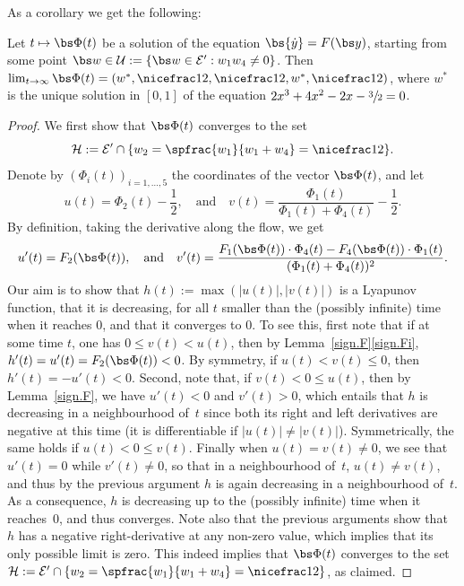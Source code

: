 As a corollary we get the following:
\begin{lemma}\label{lem:conv.lozenge}
Let $t\mapsto \bs \Phi(t)$ be a solution of the equation ${\bs{\dot y}} =F({\bs y})$, starting from some point $\bs w\in \mathcal U:=\{\bs w \in \mathcal E' : w_1w_4\neq 0\}$.
Then $\lim_{t\to \infty} \bs \Phi(t) = (w^*, \nicefrac12, \nicefrac12, w^*, \nicefrac12)$, where $w^*$ is the unique solution in $[0,1]$ of the equation $2x^3+4x^2-2x-\sfrac32=0$.
\end{lemma}
\begin{proof}
We first show that $\bs \Phi(t)$ converges to the set
\[
\mathcal H:= \mathcal E'\cap \{w_2={\spfrac{w_1}{w_1+w_4}}=\nicefrac12\}.
\]
Denote by $(\Phi_i(t))_{i=1,\dots,5}$ the coordinates of the vector $\bs \Phi(t)$, and let
\[
u(t) = \Phi_2(t) - \frac12, \quad \text{and}\quad v(t) = \frac{\Phi_1(t)}{\Phi_1(t)+ \Phi_4(t)} - \frac12.
\]
By definition, taking the derivative along the flow, we get
\[
u'(t) = F_2 (\bs \Phi(t)), \quad \text{and}\quad v'(t) = \frac{F_1(\bs \Phi(t))\cdot \Phi_4(t) - F_4(\bs \Phi(t))\cdot\Phi_1(t)}{(\Phi_1(t) + \Phi_4(t))^2 }.
\]
Our aim is to show that $h(t):=\max(|u(t)|,|v(t)|)$ is a Lyapunov function, \ie that it is decreasing, for all $t$ smaller than the (possibly infinite) time when it reaches $0$, and that it converges to $0$. To see this, first note that if at some time $t$, one has $0\le v(t)<u(t)$,
then by Lemma~\ref{sign.F}\eqref{sign.Fi}, $h'(t) = u'(t) = F_2(\bs \Phi(t)) <0$. By symmetry, if $u(t)<v(t) \le 0$, then $h'(t) = -u'(t) <0$.
Second, note that, if $v(t) < 0 \le u(t)$, then by Lemma~\ref{sign.F}, we have $u'(t) <0$ and $v'(t)>0$, which entails that $h$ is decreasing in a neighbourhood of~$t$ since both its right and left derivatives are negative at this time (it is differentiable if $|u(t)|\neq |v(t)|$).
Symmetrically, the same holds if $u(t)<0\le v(t)$.
Finally when $u(t) = v(t)\neq 0$, we see that $u'(t) = 0$ while
$v'(t)\neq 0$, so that in a neighbourhood of~$t$,
$u(t)\neq v(t)$, and thus by the previous argument $h$ is again decreasing in a neighbourhood of~$t$.
As a consequence, $h$ is decreasing up to the (possibly infinite) time when it reaches~$0$, and thus converges. Note also that the previous arguments show that~$h$ has a negative right-derivative at any non-zero value, which implies that its only possible limit is zero.
This indeed implies that $\bs \Phi(t)$ converges to the set $\mathcal H:= \mathcal E'\cap \{w_2={\spfrac{w_1}{w_1+w_4}}=\nicefrac12\}$, as claimed.


\end{proof}
